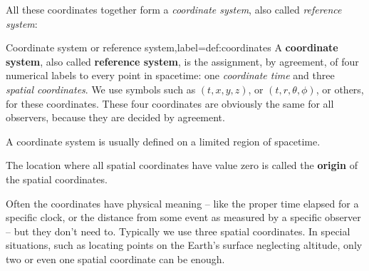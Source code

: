 \documentclass[a4paper,12pt,%
onecolumn,oneside,%
british%
]{memoir}
\renewcommand*{\|}[1][]{\nonscript\:#1\vert\nonscript\:\mathopen{}}
\begin{document}
All these coordinates together form a \emph{coordinate system}, also called \emph{reference system}:
\begin{definition}{Coordinate system or reference system,label={def:coordinates}}
  A \textbf{coordinate system}, also called \textbf{reference system}, is the assignment, by agreement, of four numerical labels to every point in spacetime: one \emph{coordinate time} and three \emph{spatial coordinates}. We use symbols such as $(t,x,y,z)$, or $(t, r, \theta,\phi)$, or others, for these coordinates. These four coordinates are obviously the same for all observers, because they are decided by agreement.

  \smallskip
  
   A coordinate system is usually defined on a limited region of spacetime.

  \smallskip

  The location where all spatial coordinates have value zero is called the \textbf{origin} of the spatial coordinates.
\end{definition}

  Often the coordinates have physical meaning -- like the proper time elapsed for a specific clock, or the distance from some event as measured by a specific observer -- but they don't need to. Typically we use three spatial coordinates. In special situations, such as locating points on the Earth's surface neglecting altitude, only two or even one spatial coordinate can be enough.
\end{document}
